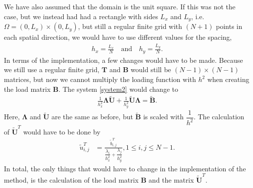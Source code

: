 We have also assumed that the domain is the unit square. If this was not the case, but we instead had had a rectangle with sides $L_x$ and $L_y$, i.e. $ \Omega = (0,L_x)\times (0,L_y)$, but still a regular finite grid with $(N+1)$ points in each spatial direction, we would have to use different values for the spacing, 
\begin{align*}
	h_x = \frac{L_x}{N} \quad \text{and} \quad h_y = \frac{L_y}{N}.
\end{align*}
In terms of the implementation, a few changes would have to be made. Because we still use a regular finite grid, $\mathbf{T}$ and $\mathbf{B}$ would still be $(N-1)\times (N-1)$ matrices, but now we cannot multiply the loading function with $h^2$ when creating the load matrix $\mathbf{B}$. The system \eqref{system2} would change to 
\begin{align*}
	\frac{1}{h_x^2}\mathbf{\Lambda\widetilde{U}} + \frac{1}{h_y^2}\mathbf{\widetilde{U}\Lambda} = \mathbf{\widetilde{B}}.
\end{align*}
Here, $\mathbf{\Lambda}$ and $\mathbf{\widetilde{U}}$ are the same as before, but $\mathbf{\widetilde{B}}$ is scaled with $\dfrac{1}{h^2}$. The calculation of $\mathbf{\widetilde{U}}^T$ would have to be done by
\begin{align*}
	\tilde{u}^T_{i,j} &= \frac{\tilde{b}^T_{i,j}}{\dfrac{\lambda_i}{h_x^2} + \dfrac{\lambda_j}{h_y^2}}, 1 \leq i, j \leq N-1.
\end{align*}
In total, the only things that would have to change in the implementation of the method, is the calculation of the load matrix $\mathbf{B}$ and the matrix $\mathbf{\widetilde{U}}^T$.

